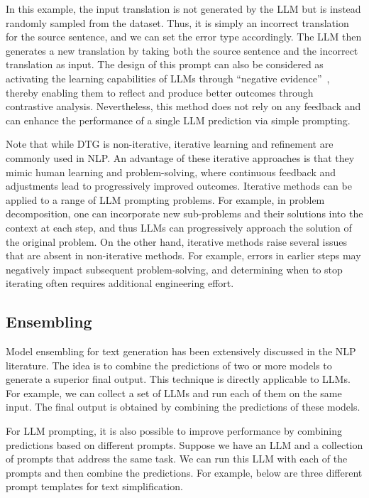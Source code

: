 In this example, the input translation is not generated by the LLM but is instead randomly sampled from the dataset. Thus, it is simply an incorrect translation for the source sentence, and we can set the error type accordingly. The LLM then generates a new translation by taking both the source sentence and the incorrect translation as input. The design of this prompt can also be considered as activating the learning capabilities of LLMs through ``negative evidence''~\cite{marcus-etal:1993negative}, thereby enabling them to reflect and produce better outcomes through contrastive analysis. Nevertheless, this method does not rely on any feedback and can enhance the performance of a single LLM prediction via simple prompting.

Note that while DTG is non-iterative, iterative learning and refinement are commonly used in NLP. An advantage of these iterative approaches is that they mimic human learning and problem-solving, where continuous feedback and adjustments lead to progressively improved outcomes. Iterative methods can be applied to a range of LLM prompting problems. For example, in problem decomposition, one can incorporate new sub-problems and their solutions into the context at each step, and thus LLMs can progressively approach the solution of the original problem. On the other hand, iterative methods raise several issues that are absent in non-iterative methods. For example, errors in earlier steps may negatively impact subsequent problem-solving, and determining when to stop iterating often requires additional engineering effort.

\subsection{Ensembling}

\noindent Model ensembling for text generation has been extensively discussed in the NLP literature. The idea is to combine the predictions of two or more models to generate a superior final output. This technique is directly applicable to LLMs. For example, we can collect a set of LLMs and run each of them on the same input. The final output is obtained by combining the predictions of these models.

For LLM prompting, it is also possible to improve performance by combining predictions based on different prompts. Suppose we have an LLM and a collection of prompts that address the same task. We can run this LLM with each of the prompts and then combine the predictions. For example, below are three different prompt templates for text simplification.

